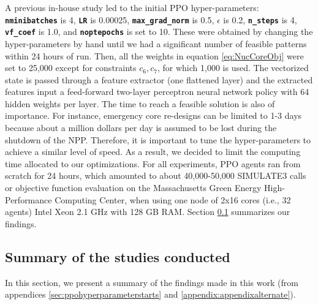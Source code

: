\documentclass[a4paper]{article}
\newcommand{\code}[1]{\colorbox{light-gray}{\small\color{blue}\textbf{\texttt{#1}}}}
\begin{document}
A previous in-house study led to the initial PPO hyper-parameters: \code{nminibatches} is 4, \code{LR} is 0.00025, \code{max\_grad\_norm} is 0.5, $\epsilon$ is 0.2, \code{n\_steps} is 4, \code{vf\_coef} is 1.0, and \code{noptepochs} is set to 10. These were obtained by changing the hyper-parameters by hand until we had a significant number of feasible patterns within 24 hours of run. Then, all the weights in equation \ref{eq:NucCoreObj} were set to 25,000 except for constraints $c_6,c_7$, for which 1,000 is used. The vectorized state is passed through a feature extractor (one flattened layer) and the extracted features input a feed-forward two-layer perceptron neural network policy with 64 hidden weights per layer.  The time to reach a feasible solution is also of importance. For instance, emergency core re-designs can be limited to 1-3 days because about a million dollars per day is assumed to be lost during the shutdown of the NPP. Therefore, it is important to tune the hyper-parameters to 
 achieve a similar level of speed. As a result, we decided to limit the computing time allocated to our optimizations. For all experiments, PPO agents ran from scratch for 24 hours, which amounted to about 40,000-50,000 SIMULATE3 calls or objective function evaluation on the Massachusetts Green Energy High-Performance Computing Center, when using one node of 2x16  cores (i.e., 32 agents) Intel Xeon 2.1 GHz with 128 GB RAM. Section \ref{sec:shortsummary} summarizes our findings.

\subsection{Summary of the studies conducted}
\label{sec:shortsummary}
In this section, we present a summary of the findings made in this work (from appendices \ref{sec:ppohyperparameterstarts} and \ref{appendix:appendixalternate}). 
\end{document}

